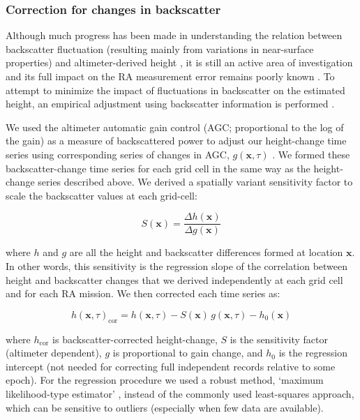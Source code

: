 \subsubsection{Correction for changes in backscatter}
\label{sec:bs-corr}

\noindent
Although much progress has been made in understanding the relation between backscatter fluctuation (resulting mainly from variations in near-surface properties) and altimeter-derived height \parencite{Arthern2001, Davis1993, Legresy1998, Partington1989, Remy2012, Ridley1988}, it is still an active area of investigation and its full impact on the RA measurement error remains poorly known \parencite{Remy2012}. To attempt to minimize the impact of fluctuations in backscatter on the estimated height, an empirical adjustment using backscatter information is performed \parencite[as have been applied by,][]{Davis2004, Khvorostovsky2012, Remy2009, Wingham2006, Wingham1998, Zwally2005}.

We used the altimeter automatic gain control (AGC; proportional to the log of the gain) as a measure of backscattered power to adjust our height-change time series using corresponding series of changes in AGC, $g(\mathbf x,\tau)$ \parencite{Zwally2005}. We formed these backscatter-change time series for each grid cell in the same way as the height-change series described above. We derived a spatially variant sensitivity factor to scale the backscatter values at each grid-cell:

\begin{equation}
  S(\mathbf x) = \frac{\Delta h(\mathbf x)}{\Delta g(\mathbf x)}
\end{equation}

\noindent
where $h$ and $g$ are all the height and backscatter differences formed at location $\mathbf x$. In other words, this sensitivity is the regression slope of the correlation between height and backscatter changes that we derived independently at each grid cell and for each RA mission. We then corrected each time series as:

\begin{equation}
  h(\mathbf x,\tau)_\text{cor} = h(\mathbf x,\tau) 
    - S(\mathbf x) \, g(\mathbf x,\tau) - h_0(\mathbf x)
  \label{c2e4}
\end{equation}

\noindent
where $h_\text{cor}$ is backscatter-corrected height-change, $S$ is the sensitivity factor (altimeter dependent), $g$ is proportional to gain change, and $h_0$ is the regression intercept (not needed for correcting full independent records relative to some epoch). For the regression procedure we used a robust method, `maximum likelihood-type estimator' \parencite[][p. 43]{Huber1981}, instead of the commonly used least-squares approach, which can be sensitive to outliers (especially when few data are available).

